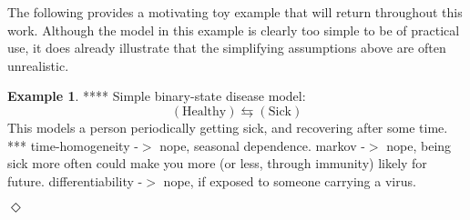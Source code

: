 \documentclass[10pt,a4paper]{paper}
\theoremstyle{definition}
\newtheorem{exmp}{Example}%
\newcommand{\exampleend}{\hfill$\Diamond$}
\begin{document}
The following provides a motivating toy example that will return throughout this work. Although the model in this example is clearly too simple to be of practical use, it does already illustrate that the simplifying assumptions above are often unrealistic.
\begin{exmp}
**** Simple binary-state disease model:
\begin{equation*}
(\text{Healthy}) \leftrightarrows (\text{Sick})
\end{equation*}
This models a person periodically getting sick, and recovering after some time. *** time-homogeneity -$>$ nope, seasonal dependence. markov -$>$ nope, being sick more often could make you more (or less, through immunity) likely for future. differentiability -$>$ nope, if exposed to someone carrying a virus.

%
%

\exampleend
\end{exmp}
\end{document}

